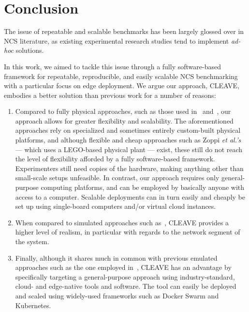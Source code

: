 \section{Conclusion}\label{sec:conclusion}

The issue of repeatable and scalable benchmarks has been largely glossed over in \gls{NCS} literature, as existing experimental research studies tend to implement \emph{ad-hoc} solutions.

In this work, we aimed to tackle this issue through a fully software-based framework for repeatable, reproducible, and easily scalable \gls{NCS} benchmarking with a particular focus on edge deployment.
We argue our approach, \gls{CLEAVE}, embodies a better solution than previous work for a number of reasons:
\begin{enumerate}
    \item Compared to fully physical approaches, such as those used in\ \cite{Baumann2018LowPower} and\ \cite{Cuenca2019UAV}, our approach allows for greater flexibility and scalability.
    The aforementioned approaches rely on specialized and sometimes entirely custom-built physical platforms, and although flexible and cheap approaches such as Zoppi \emph{et al.'s} --- which uses a LEGO-based physical plant --- exist, these still do not reach the level of flexibility afforded by a fully software-based framework. 
    Experimenters still need copies of the hardware, making anything other than small-scale setups unfeasible.
    In contrast, our approach requires only general-purpose computing platforms, and can be employed by basically anyone with access to a computer.
    Scalable deployments can in turn easily and cheaply be set up using single-board computers and/or virtual cloud instances.
    \item When compared to simulated approaches such as\ \cite{Ma2019DynamicSched}, \gls{CLEAVE} provides a higher level of realism, in particular with regards to the network segment of the system.
    \item Finally, although it shares much in common with previous emulated approaches such as the one employed in\ \cite{Wang2020VoltageControl}, \gls{CLEAVE} has an advantage by specifically targeting a general-purpose approach using industry-standard, cloud- and edge-native tools and software.
    The tool can easily be deployed and scaled using widely-used frameworks such as Docker Swarm and Kubernetes.
\end{enumerate}


